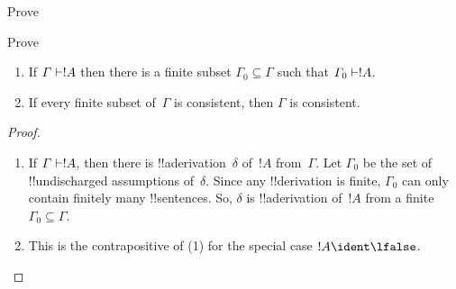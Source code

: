 \documentclass[../../../include/open-logic-section]{subfiles}
\begin{document}
\begin{prob}
Prove 
\end{prob}
\tagendprob

\begin{prob}
Prove 
\end{prob}
\tagendprob

\begin{prop}[Compactness]
  \begin{enumerate}
  \item If $\Gamma \Proves !A$ then there is a finite subset $\Gamma_0
    \subseteq \Gamma$ such that $\Gamma_0 \Proves !A$.
  \item If every finite subset of~$\Gamma$ is
    consistent, then $\Gamma$ is consistent.
  \end{enumerate}
\end{prop}

\begin{proof}
  \begin{enumerate}
    \item If $\Gamma \Proves !A$, then there is
      !!a{derivation}~$\delta$ of~$!A$ from~$\Gamma$. Let $\Gamma_0$
      be the set of !!{undischarged} assumptions of~$\delta$.  Since
      any !!{derivation} is finite, $\Gamma_0$ can only contain
      finitely many !!{sentence}s.  So, $\delta$ is !!a{derivation}
      of~$!A$ from a finite~$\Gamma_0 \subseteq \Gamma$.
    \item This is the contrapositive of (1) for the special case $!A
      \ident \lfalse$.
  \end{enumerate}
\end{proof}
\end{document}
